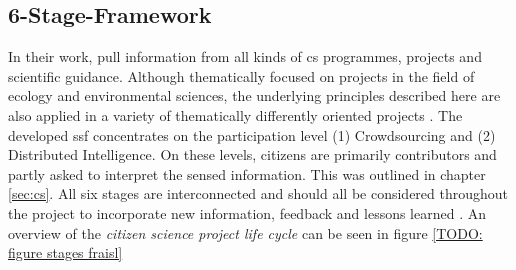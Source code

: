 \subsection{6-Stage-Framework}\label{subsec:ssf}

In their work, \autocite{fraislCitizenScienceEnvironmental2022} pull information from all kinds of \acrshort{cs} programmes, projects and scientific guidance. Although thematically focused on projects in the field of ecology and environmental sciences, the underlying principles described here are also applied in a variety of thematically differently oriented projects \autocite{fraislCitizenScienceEnvironmental2022}. The developed \acrfull{ssf} concentrates on the participation level (1) Crowdsourcing and (2) Distributed Intelligence. On these levels, citizens are primarily contributors and partly asked to interpret the sensed information. This was outlined in chapter \ref{sec:cs}. All six stages are interconnected and should all be considered throughout the project to incorporate new information, feedback and lessons learned \autocite{fraislCitizenScienceEnvironmental2022}. An overview of the \textit{citizen science project life cycle} can be seen in figure \ref{TODO: figure stages fraisl}


